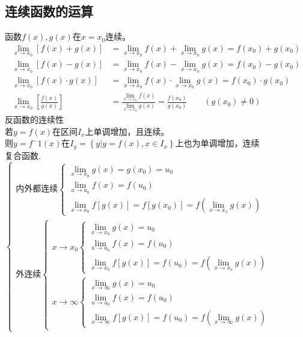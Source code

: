 \subsection{连续函数的运算}
函数$f(x),g(x)$在$x=x_0$连续。
\begin{displaymath}
    \begin{split}
        \lim\limits_{x\to x_0}\left[f(x)+g(x)\right]&=\lim\limits_{x\to x_0}f(x)+\lim\limits_{x\to x_0}g(x)=f(x_0)+g(x_0)\\
\lim\limits_{x\to x_0}\left[f(x)-g(x)\right]&=\lim\limits_{x\to x_0}f(x)-\lim\limits_{x\to x_0}g(x)=f(x_0)-g(x_0)\\
\lim\limits_{x\to x_0}\left[f(x)\cdot g(x)\right]&=\lim\limits_{x\to x_0}f(x)\cdot \lim\limits_{x\to x_0}g(x)=f(x_0)\cdot g(x_0)\\
\lim\limits_{x\to x_0}\left[\frac{f(x)}{g(x)}\right]&=\frac{\lim\limits_{x\to x_0}f(x)}{\lim\limits_{x\to x_0}g(x)}=\frac{f(x_0)}{g(x_0)}\qquad \left(g(x_0)\neq 0\right)
    \end{split}
\end{displaymath}
反函数的连续性\\
若$y=f(x)$在区间$I_x$上单调增加，且连续。\\
则$y=f^-1(x)$在$I_y=\left\{y|y=f(x),x\in I_x\right\}$上也为单调增加，连续\\
复合函数,$\begin{cases}
    \mbox{内外都连续}\begin{cases}
    \lim\limits_{x\to x_0}g(x)=g(x_0)=u_0\\
    \lim\limits_{u\to u_0}f(x)=f(u_0)\\
    \lim\limits_{x\to x_0}f\left[g(x)\right]=f\left[g(x_0)\right]=f(\lim\limits_{x\to x_o}g(x))
\end{cases}\\
    \mbox{外连续}\begin{cases}
        x\rightarrow x_0\begin{cases}
        \lim\limits_{x\to x_0}g(x)=u_0\\
        \lim\limits_{u\to u_0}f(x)=f(u_0)\\
        \lim\limits_{x\to x_0}f\left[g(x)\right]=f(u_0)=f(\lim\limits_{x\to x_o}g(x))
    \end{cases}\\
        x\rightarrow \infty\begin{cases}
            \lim\limits_{x\to \infty}g(x)=u_0\\
            \lim\limits_{u\to u_0}f(x)=f(u_0)\\
            \lim\limits_{x\to \infty}f\left[g(x)\right]=f(u_0)=f(\lim\limits_{x\to \infty}g(x))
        \end{cases}
    \end{cases}
\end{cases}$


